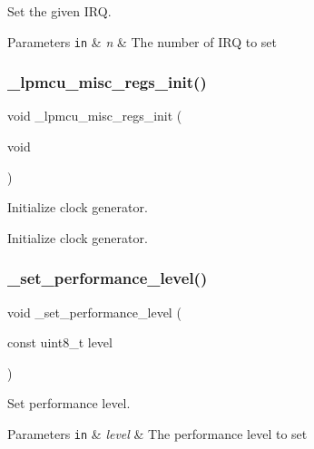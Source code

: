 Set the given I\+RQ. 


\begin{DoxyParams}[1]{Parameters}
\mbox{\tt in}  & {\em n} & The number of I\+RQ to set \\
\hline
\end{DoxyParams}
\mbox{\label{group___h_p_l_ga3dd85007c9fdeed2ffe1166a33dd6519}} 
\subsubsection{\texorpdfstring{\+\_\+lpmcu\+\_\+misc\+\_\+regs\+\_\+init()}{\_lpmcu\_misc\_regs\_init()}}
{\footnotesize\ttfamily void \+\_\+lpmcu\+\_\+misc\+\_\+regs\+\_\+init (\begin{DoxyParamCaption}\item[{void}]{ }\end{DoxyParamCaption})}



Initialize clock generator. 

Initialize clock generator. \mbox{\label{group___h_p_l_ga1668b7fc690ec56e1f3d54d9f3b8e5f2}} 
\subsubsection{\texorpdfstring{\+\_\+set\+\_\+performance\+\_\+level()}{\_set\_performance\_level()}}
{\footnotesize\ttfamily void \+\_\+set\+\_\+performance\+\_\+level (\begin{DoxyParamCaption}\item[{const uint8\+\_\+t}]{level }\end{DoxyParamCaption})}



Set performance level. 


\begin{DoxyParams}[1]{Parameters}
\mbox{\tt in}  & {\em level} & The performance level to set \\
\hline
\end{DoxyParams}
\mbox{\label{group___h_p_l_gab834a3310b05b1118ac7cf5ad90835ba}} 
